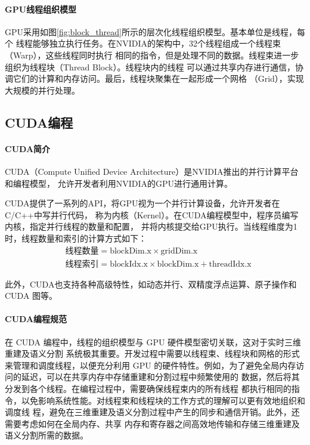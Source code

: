 \paragraph{GPU线程组织模型}

\par GPU采用如图\ref{fig:block_thread}\cite{nvidia_cuda}所示的层次化线程组织模型。基本单位是线程，每个
线程能够独立执行任务。在NVIDIA的架构中，32个线程组成一个线程束（Warp），这些线程同时执行
相同的指令，但是处理不同的数据。线程束进一步组织为线程块（Thread Block）。线程块内的线程
可以通过共享内存进行通信，协调它们的计算和内存访问。最后，线程块聚集在一起形成一个网格
（Grid），实现大规模的并行处理。

\subsection{CUDA编程}

\paragraph{CUDA简介}

\par CUDA（Compute Unified Device Architecture）是NVIDIA推出的并行计算平台和编程模型，
允许开发者利用NVIDIA的GPU进行通用计算。

\par CUDA提供了一系列的API，将GPU视为一个并行计算设备，允许开发者在C/C++中写并行代码，
称为内核（Kernel）。在CUDA编程模型中，程序员编写内核，指定并行线程的数量和配置，
并将内核提交给GPU执行。当线程维度为1时，线程数量和索引的计算方式如下：
\begin{equation}
    \begin{aligned}
    & \text{线程数量} = \text{blockDim.x} \times \text{gridDim.x} \\
    & \text{线程索引} = \text{blockIdx.x} \times \text{blockDim.x} + \text{threadIdx.x}
    \end{aligned}
\end{equation}

\par 此外，CUDA也支持各种高级特性，如动态并行、双精度浮点运算、原子操作和 CUDA 图等。

\paragraph{CUDA编程规范}

\par 在 CUDA 编程中，线程的组织模型与 GPU 硬件模型密切关联，这对于实时三维重建及语义分割
系统极其重要。开发过程中需要以线程束、线程块和网格的形式来管理和调度线程，以便充分利用 GPU 
的硬件特性。例如，为了避免全局内存访问的延迟，可以在共享内存中存储重建和分割过程中频繁使用的
数据，然后将其分发到各个线程\cite{nvidia_cuda}。在编程过程中，需要确保线程束内的所有线程
都执行相同的指令，以免影响系统性能。对线程束和线程块的工作方式的理解可以更有效地组织和调度线
程，避免在三维重建及语义分割过程中产生的同步和通信开销。此外，还需要考虑如何在全局内存、共享
内存和寄存器之间高效地传输和存储三维重建及语义分割所需的数据。